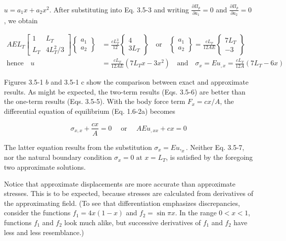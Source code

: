 \documentclass[10pt]{article}
\begin{document}
\captionsetup{singlelinecheck=false}

$u=a_{1} x+a_{2} x^{2}$. After substituting into Eq. 3.5-3 and writing $\frac{\partial \Pi_{p}}{\partial a_{1}}=0$ and $\frac{\partial \Pi_{p}}{\partial a_{2}}=0$, we obtain

\begin{align*}
A E L_{T}\begin{bmatrix}
1 & L_{T} \\
L_{T} & 4 L_{T}^{2} / 3
\end{bmatrix}\begin{Bmatrix}
a_{1} \\
a_{2}
\end{Bmatrix} &= \frac{c L_{T}^{3}}{12}\begin{Bmatrix}
4 \\
3 L_{T}
\end{Bmatrix} \quad \text{or} \quad \begin{Bmatrix}
a_{1} \\
a_{2}
\end{Bmatrix} = \frac{c L_{T}}{12 A E}\begin{Bmatrix}
7 L_{T} \\
-3
\end{Bmatrix} \\
\text{hence} \quad u &= \frac{c L_{T}}{12 A E}\left(7 L_{T} x-3 x^{2}\right) \quad \text{and} \quad \sigma_{x}=E u_{,x}=\frac{c L_{T}}{12 A}\left(7 L_{T}-6 x\right) \tag{3.5-6b}
\end{align*}

Figures 3.5-1 $b$ and 3.5-1 c show the comparison between exact and approximate results. As might be expected, the two-term results (Eqs. 3.5-6) are better than the one-term results (Eqs. 3.5-5). With the body force term $F_{x}=c x / A$, the differential equation of equilibrium (Eq. 1.6-2a) becomes

\begin{equation*}
\sigma_{x, x}+\frac{c x}{A}=0 \quad \text { or } \quad A E u_{, x x}+c x=0 \tag{3.5-7}
\end{equation*}

The latter equation results from the substitution $\sigma_{x}=E u,_{x}$. Neither Eq. 3.5-7, nor the natural boundary condition $\sigma_{x}=0 \text{ at } x=L_{T}$, is satisfied by the foregoing two approximate solutions.

Notice that approximate displacements are more accurate than approximate stresses. This is to be expected, because stresses are calculated from derivatives of the approximating field. (To see that differentiation emphasizes discrepancies, consider the functions $f_{1}=4 x(1-x)$ and $f_{2}=\sin \pi x$. In the range $0<x<1$, functions $f_{1}$ and $f_{2}$ look much alike, but successive derivatives of $f_{1}$ and $f_{2}$ have less and less resemblance.)
\end{document}
